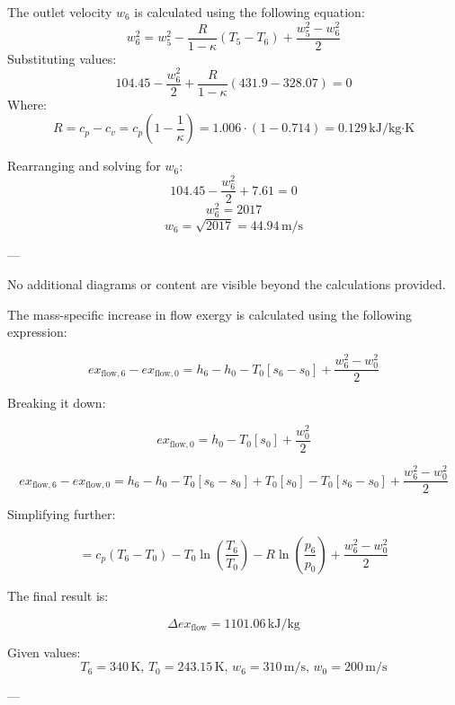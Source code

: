 The outlet velocity \( w_6 \) is calculated using the following equation:  
\[
w_6^2 = w_5^2 - \frac{R}{1 - \kappa} (T_5 - T_6) + \frac{w_5^2 - w_6^2}{2}
\]  
Substituting values:  
\[
104.45 - \frac{w_6^2}{2} + \frac{R}{1 - \kappa} (431.9 - 328.07) = 0
\]  
Where:  
\[
R = c_p - c_v = c_p \left( 1 - \frac{1}{\kappa} \right) = 1.006 \cdot (1 - 0.714) = 0.129 \, \text{kJ/kg·K}
\]  

Rearranging and solving for \( w_6 \):  
\[
104.45 - \frac{w_6^2}{2} + 7.61 = 0
\]  
\[
w_6^2 = 2017
\]  
\[
w_6 = \sqrt{2017} = 44.94 \, \text{m/s}
\]  

---

No additional diagrams or content are visible beyond the calculations provided.

The mass-specific increase in flow exergy is calculated using the following expression:  

\[
ex_{\text{flow},6} - ex_{\text{flow},0} = h_6 - h_0 - T_0 \left[ s_6 - s_0 \right] + \frac{w_6^2 - w_0^2}{2}
\]

Breaking it down:  

\[
ex_{\text{flow},0} = h_0 - T_0 \left[ s_0 \right] + \frac{w_0^2}{2}
\]

\[
ex_{\text{flow},6} - ex_{\text{flow},0} = h_6 - h_0 - T_0 \left[ s_6 - s_0 \right] + T_0 \left[ s_0 \right] - T_0 \left[ s_6 - s_0 \right] + \frac{w_6^2 - w_0^2}{2}
\]

Simplifying further:  

\[
= c_p \left( T_6 - T_0 \right) - T_0 \ln \left( \frac{T_6}{T_0} \right) - R \ln \left( \frac{p_6}{p_0} \right) + \frac{w_6^2 - w_0^2}{2}
\]

The final result is:  

\[
\Delta ex_{\text{flow}} = 1101.06 \, \text{kJ/kg}
\]

Given values:  
\[
T_6 = 340 \, \text{K}, \, T_0 = 243.15 \, \text{K}, \, w_6 = 310 \, \text{m/s}, \, w_0 = 200 \, \text{m/s}
\]

---